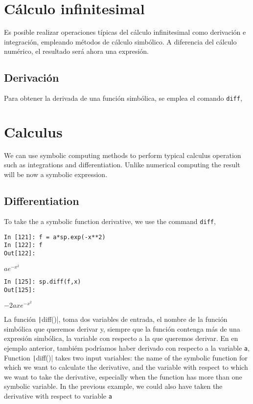 \begin{paracol}{2}
\section{Cálculo infinitesimal}
Es posible realizar operaciones típicas del cálculo infinitesimal como derivación e integración, empleando métodos de cálculo simbólico. A diferencia del cálculo numérico, el resultado será ahora una expresión.
\subsection{Derivación}
Para obtener la derivada de una función simbólica, se emplea el comando \texttt{diff},
\switchcolumn
\section{Calculus}
We can use symbolic computing methods to perform typical calculus operation such as integrations and differentiation. Unlike numerical computing the result will be now a symbolic expression.  
\subsection{Differentiation}
To take the  a symbolic function derivative, we use the command \texttt{diff},
\end{paracol}

\begin{center}
	\begin{minipage}{.5\textwidth}
		\begin{verbatim}
In [121]: f = a*sp.exp(-x**2)
In [122]: f
Out[122]:
		\end{verbatim}
$ae^{-x^2}$
		\begin{verbatim}
In [125]: sp.diff(f,x)
Out[125]: 
\end{verbatim}
$-2axe^{-x^2}$
	\end{minipage}
\end{center}

\begin{paracol}{2}
La función \texttt|diff()|, toma dos variables de entrada, el nombre de la función simbólica que queremos derivar y, siempre que la función contenga más de una expresión simbólica, la variable con respecto a la que queremos derivar. En en ejemplo anterior, tambiém podríamos haber derivado con respecto a la variable \texttt{a},
\switchcolumn
Function \texttt|diff()| takes two input variables: the name of the symbolic function for which we want to calculate the derivative, and the variable with respect to which we want to take the derivative, especially when the function has more than one symbolic variable. In the previous example, we could also have taken the derivative with respect to variable \texttt{a} 
\end{paracol}

